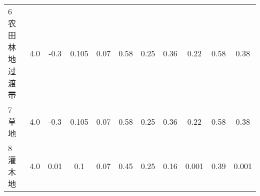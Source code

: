 \begin{landscape}
\begin{table}[htbp]
\begin{tabular}{@{}lcccccccccc@{}}
    6 农田林地过渡带      & 4.0        & -0.3                                                                         & 0.105                                                                                                           & 0.07                                                                                                            & 0.58                                                                                                            & 0.25                                                                                                            & 0.36                                                                                                            & 0.22                                                                                                            & 0.58                                                                                                            & 0.38                                                                                                            \\
    7 草地           & 4.0        & -0.3                                                                         & 0.105                                                                                                           & 0.07                                                                                                            & 0.58                                                                                                            & 0.25                                                                                                            & 0.36                                                                                                            & 0.22                                                                                                            & 0.58                                                                                                            & 0.38                                                                                                            \\
    8 灌木地          & 4.0        & 0.01                                                                         & 0.1                                                                                                             & 0.07                                                                                                            & 0.45                                                                                                            & 0.25                                                                                                            & 0.16                                                                                                            & 0.001                                                                                                           & 0.39                                                                                                            & 0.001                                                                                                           \\

\end{tabular}
\end{table}
\end{landscape}
